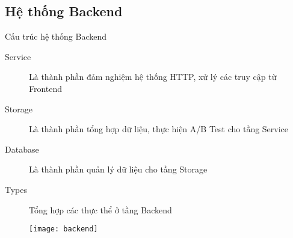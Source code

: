 \subsection{Hệ thống Backend}

\begin{frame}{Cấu trúc hệ thống Backend}
	\begin{description}
		\item[Service] Là thành phần đảm nghiệm hệ thống HTTP, xử lý các truy cập từ Frontend
		\item[Storage] Là thành phần tổng hợp dữ liệu, thực hiện A/B Test cho tầng Service
		\item[Database] Là thành phần quản lý dữ liệu cho tầng Storage
		\item[Types] Tổng hợp các thực thể ở tầng Backend
	\end{description}
	\begin{figure}
		\texttt{[image: backend]}
	\end{figure}
\end{frame}


